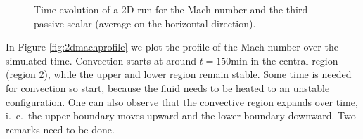 \begin{figure}[t!]
      \centering
     \centering
	\hfill
	\caption{Time evolution of a 2D run for the Mach number and the third passive scalar (average on the horizontal direction).}
	\label{fig:2dsinglefirst}
\end{figure}
In Figure \ref{fig:2dmachprofile} we plot the profile of the Mach number over the simulated time. Convection starts at around $t=150 \mathrm{min}$ in the central region (region 2), while the upper and lower region remain stable. Some time is needed for convection so start, because the fluid needs to be heated to an unstable configuration. One can also observe that the convective region expands over time, i.\ e.\ the upper boundary moves upward and the lower boundary downward. Two remarks need to be done. 

